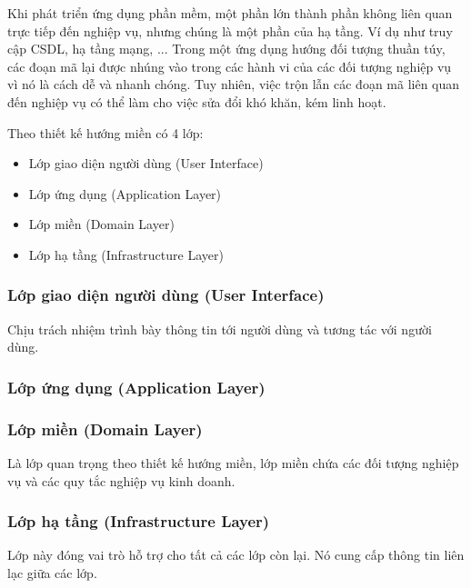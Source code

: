 

Khi phát triển ứng dụng phần mềm, một phần lớn thành phần không liên quan trực tiếp đến nghiệp vụ, nhưng chúng là một phần của hạ tầng. Ví dụ như truy cập CSDL, hạ tầng mạng, ... Trong một ứng dụng hướng đối tượng thuần túy, các đoạn mã lại được nhúng vào trong các hành vi của các đối tượng nghiệp vụ vì nó là cách dễ và nhanh chóng. Tuy nhiên, việc trộn lẫn các đoạn mã liên quan đến nghiệp vụ có thể làm cho việc sửa đổi  khó khăn, kém linh hoạt.

Theo thiết kế hướng miền có 4 lớp:
\begin{itemize}
    \item Lớp giao diện người dùng (User Interface)
    \item Lớp ứng dụng (Application Layer)
    \item Lớp miền (Domain Layer)
    \item Lớp hạ tầng (Infrastructure Layer)
\end{itemize}


\subsubsection{Lớp giao diện người dùng (User Interface)}
Chịu trách nhiệm trình bày thông tin tới người   dùng và  tương tác với  người dùng.
\subsubsection{Lớp ứng dụng (Application Layer)}

\subsubsection{Lớp miền (Domain Layer)}
Là lớp quan trọng theo  thiết kế hướng   miền,  lớp miền chứa các đối tượng nghiệp vụ và các quy tắc nghiệp vụ kinh doanh. 
\subsubsection{Lớp hạ tầng (Infrastructure Layer)} 

Lớp này đóng vai trò  hỗ trợ cho tất cả các lớp còn lại. Nó cung cấp thông tin liên lạc giữa các lớp.



